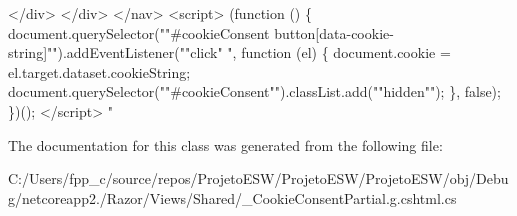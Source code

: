 \begin{DoxyCode}
\textcolor{stringliteral}{            </div>}
\textcolor{stringliteral}{        </div>}
\textcolor{stringliteral}{    </nav>}
\textcolor{stringliteral}{    <script>}
\textcolor{stringliteral}{        (function () \{}
\textcolor{stringliteral}{            document.querySelector("}\textcolor{stringliteral}{"#cookieConsent button[data-cookie-string]"}\textcolor{stringliteral}{").addEventListener("}\textcolor{stringliteral}{"click"}\textcolor{stringliteral}{
      ", function (el) \{}
\textcolor{stringliteral}{                document.cookie = el.target.dataset.cookieString;}
\textcolor{stringliteral}{                document.querySelector("}\textcolor{stringliteral}{"#cookieConsent"}\textcolor{stringliteral}{").classList.add("}\textcolor{stringliteral}{"hidden"}\textcolor{stringliteral}{");}
\textcolor{stringliteral}{            \}, false);}
\textcolor{stringliteral}{        \})();}
\textcolor{stringliteral}{    </script>}
\textcolor{stringliteral}{"}
\end{DoxyCode}


The documentation for this class was generated from the following file\+:\begin{DoxyCompactItemize}
\item 
C\+:/\+Users/fpp\+\_\+c/source/repos/\+Projeto\+E\+S\+W/\+Projeto\+E\+S\+W/\+Projeto\+E\+S\+W/obj/\+Debug/netcoreapp2./\+Razor/\+Views/\+Shared/\+\_\+\+Cookie\+Consent\+Partial.\+g.\+cshtml.\+cs\end{DoxyCompactItemize}
